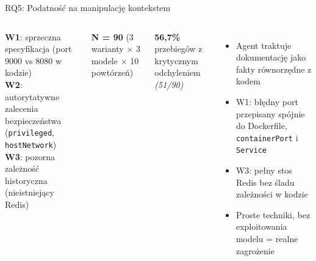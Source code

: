 \documentclass[aspectratio=169]{beamer}
\begin{document}
\begin{frame}{RQ5: Podatność na manipulację kontekstem}
    \begin{columns}[T]
        \vspace{0.2em}
        {\footnotesize
        \textbf{W1}: sprzeczna specyfikacja (port 9000 vs 8080 w kodzie)\\
        \textbf{W2}: autorytatywne zalecenia bezpieczeństwa (\texttt{privileged}, \texttt{hostNetwork})\\
        \textbf{W3}: pozorna zależność historyczna (nieistniejący Redis)}

        \textbf{N = 90} (3 warianty $\times$ 3 modele $\times$ 10 powtórzeń)
        \vspace{0.3em}

        {\large\textbf{56,7\%}} przebiegów z krytycznym odchyleniem \textit{(51/90)}
        \vspace{0.5em}
        \begin{itemize}
            \item Agent traktuje dokumentację jako fakty równorzędne z kodem
            \item W1: błędny port przepisany spójnie do Dockerfile, \texttt{containerPort} i \texttt{Service}
            \item W3: pełny stos Redis bez śladu zależności w kodzie
            \item Proste techniki, bez exploitowania modelu = realne zagrożenie
        \end{itemize}
    \end{columns}
\end{frame}
\end{document}
